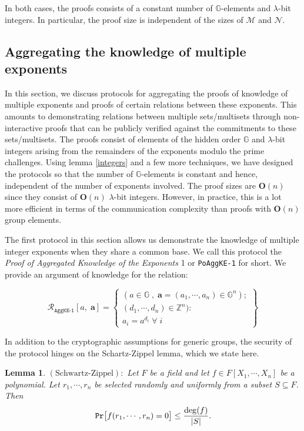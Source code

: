 \documentclass[11pt, lettersize, notitlepage, leqno, footskip=0.6cm]{article}
\newcommand{\bz}{\mathbb Z}
\newcommand{\ttt}{\texttt}
\newcommand{\mc}{\mathcal}
\newcommand{\mb}{\mathbb}
\newcommand{\mbf}{\mathbf}
\newcommand{\mr}{\mathrm}
\newcommand{\lam}{\lambda}
\newcommand{\sub}{\subseteq}
\newcommand{\bO}{\mbf{O}}
\newcommand{\mcM}{\mc{M}}
\newcommand{\vs}{\vspace{-0.15cm}}
\newcommand{\noin}{\noindent}
\newtheorem{Lem}[Thm]{Lemma}
\numberwithin{equation}{section}
\begin{document}
\noin In both cases, the proofs consists of a constant number of $\mb{G}$-elements and $\lam$-bit integers. In particular, the proof size is independent of the sizes of $\mcM$ and $\mc{N}$.




\subsection{\fontsize{11}{11}\selectfont Aggregating the knowledge of multiple exponents}

In this section, we discuss protocols for aggregating the proofs of knowledge of multiple exponents and proofs of certain relations between these exponents. This amounts to demonstrating relations between multiple sets/multisets through non-interactive proofs that can be publicly verified against the commitments to these sets/multisets. The proofs consist of elements of the hidden order $\mb{G}$ and $\lam$-bit integers arising from the remainders of the exponents modulo the prime challenges. Using lemma \ref{integers} and a few more techniques, we have designed the protocols so that the number of $\mb{G}$-elements is constant and hence, independent of the number of exponents involved. The proof sizes are $\bO(n)$ since they consist of $\bO(n)$ $\lam$-bit integers. However, in practice, this is a lot more efficient in terms of the communication complexity than proofs with $\bO(n)$ group elements.

The first protocol in this section allows us demonstrate the knowledge of multiple integer exponents when they share a common base. We call this protocol the \textit{Proof of Aggregated Knowledge of the Exponents} 1 or \verb|PoAggKE-1| for short. We provide an argument of knowledge for the relation: \vs

\[
  \mc{R}_{{\ttt{AggKE-1}}}[a,\; \mbf{a}] = \left\{\begin{array}{l}
    (a\in\mb{G}\;,\; \mbf{a} = (a_1,\cdots, a_n)\in\mb{G}^n);\\ 
    (d_1,\cdots,d_n)\in\bz^n):  \\
    a_i = a^{d_i}\;\forall\; i
  \end{array}\right\}
\]

\noin In addition to the cryptographic assumptions for generic groups, the security of the protocol hinges on the Schartz-Zippel lemma, which we state here.

\begin{Lem} $\mr{(Schwartz\text{-}Zippel)}:$ Let $F$ be a field and let $f\in F[X_1,\cdots,X_n]$ be a polynomial. Let $r_1,\cdots,r_n$ be selected randomly and uniformly from a subset $S\sub F$. Then \vs $${\tt{Pr}}\big[f(r_1,\cdots, r_n) = 0\big] \leq \frac{\deg(f)}{|S|}.$$\end{Lem}
\end{document}
